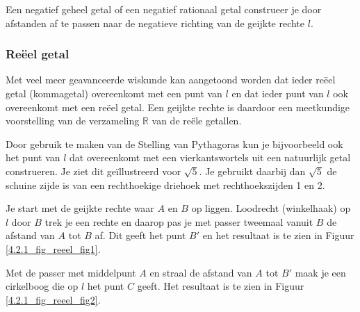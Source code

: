 
Een negatief geheel getal of een negatief rationaal getal construeer je door afstanden af te passen naar de negatieve richting van de geijkte rechte $l$.

\subsubsection{Re\"eel getal}

Met veel meer geavanceerde wiskunde kan aangetoond worden dat ieder re\"eel getal (kommagetal) overeenkomt met een punt van $l$ en dat ieder punt van $l$ ook overeenkomt met een re\"eel getal. Een geijkte rechte is daardoor een meetkundige voorstelling van de verzameling $\mathbb{R}$ van de re\"ele getallen.\vspace{2mm}

Door gebruik te maken van de Stelling van Pythagoras kun je bijvoorbeeld ook het punt van $l$ dat overeenkomt met een vierkantswortels uit een natuurlijk getal construeren.
Je ziet dit ge\"illustreerd voor $\sqrt{5}$.
Je gebruikt daarbij dan $\sqrt{5}$ de schuine zijde is van een rechthoekige driehoek met rechthoekszijden 1 en 2.\vspace{5mm}

Je start met de geijkte rechte waar $A$ en $B$ op liggen.
Loodrecht (winkelhaak) op $l$ door $B$ trek je een rechte en daarop pas je met passer tweemaal vanuit $B$ de afstand van $A$ tot $B$ af.
Dit geeft het punt $B'$ en het resultaat is te zien in Figuur \ref{4.2.1_fig_reeel_fig1}.

Met de passer met middelpunt $A$ en straal de afstand van $A$ tot $B'$ maak je een cirkelboog die op $l$ het punt $C$ geeft.
Het resultaat is te zien in Figuur \ref{4.2.1_fig_reeel_fig2}.



